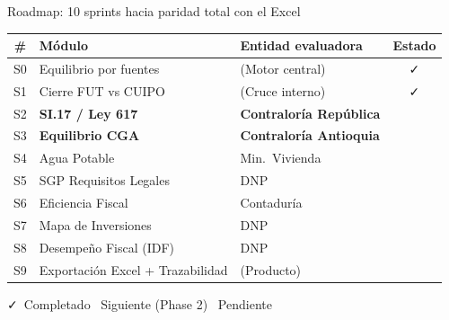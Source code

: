 \documentclass[aspectratio=169,12pt]{beamer}
\newcommand{\cmark}{\textcolor{verde}{\faCheck}}
\newcommand{\xmark}{\textcolor{rojo}{\faTimes}}
\newcommand{\wmark}{\textcolor{amber}{\faExclamationTriangle}}
\begin{document}
\begin{frame}{Roadmap: 10 sprints hacia paridad total con el Excel}

\small
\renewcommand{\arraystretch}{1.25}
\begin{center}
\begin{tabular}{c l l c}
\toprule
\textbf{\#} & \textbf{M\'odulo} & \textbf{Entidad evaluadora} & \textbf{Estado} \\
\midrule
S0 & Equilibrio por fuentes & (Motor central) & \cmark \\
S1 & Cierre FUT vs CUIPO & (Cruce interno) & \cmark \\
\rowcolor{amber!12}
S2 & \textbf{SI.17 / Ley 617} & \textbf{Contralor\'ia Rep\'ublica} & \wmark \\
\rowcolor{amber!12}
S3 & \textbf{Equilibrio CGA} & \textbf{Contralor\'ia Antioquia} & \wmark \\
S4 & Agua Potable & Min.~Vivienda & \xmark \\
S5 & SGP Requisitos Legales & DNP & \xmark \\
S6 & Eficiencia Fiscal & Contadur\'ia & \xmark \\
S7 & Mapa de Inversiones & DNP & \xmark \\
S8 & Desempe\~no Fiscal (IDF) & DNP & \xmark \\
S9 & Exportaci\'on Excel + Trazabilidad & (Producto) & \xmark \\
\bottomrule
\end{tabular}
\end{center}

\vspace{4pt}
\centering
\cmark\ Completado \quad \wmark\ Siguiente (Phase 2) \quad \xmark\ Pendiente
\end{frame}
\end{document}
